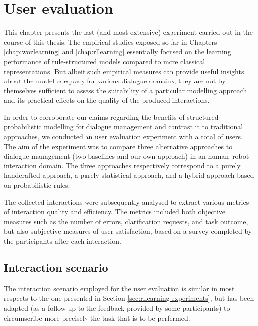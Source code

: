 \chapter{User evaluation}
\label{chap:user-evaluation}


This chapter presents the last (and most extensive) experiment carried out in the course of this thesis. The empirical studies exposed so far in Chapters \ref{chap:wozlearning} and \ref{chap:rllearning} essentially focused on the learning performance of rule-structured models compared to more classical representations. But albeit such empirical measures can provide useful insights about the model adequacy for various dialogue domains, they are not by themselves sufficient to assess the suitability of a particular modelling approach and its practical effects on the quality of the produced interactions. 

In order to corroborate our claims regarding the benefits of structured probabilistic modelling for dialogue management and contrast it to traditional approaches, we conducted an user evaluation experiment with a total of  users. The aim of the experiment was to compare three alternative approaches to dialogue management (two baselines and our own approach) in an human--robot interaction domain.  The three approaches respectively correspond to a purely handcrafted approach, a purely statistical approach, and a hybrid approach based on probabilistic rules. 

The collected interactions were subsequently analysed to extract various metrics of interaction quality and efficiency.  The metrics included both objective measures such as the number of errors, clarification requests, and task outcome, but also subjective measures of user satisfaction, based on a survey completed by the participants after each interaction. 


\section{Interaction scenario}

The interaction scenario employed for the user evaluation is similar in most respects to the one presented in Section \ref{sec:rllearning-experiments}, but has been adapted (as a follow-up to the feedback provided by some participants) to circumscribe more precisely the task that is to be performed. 

